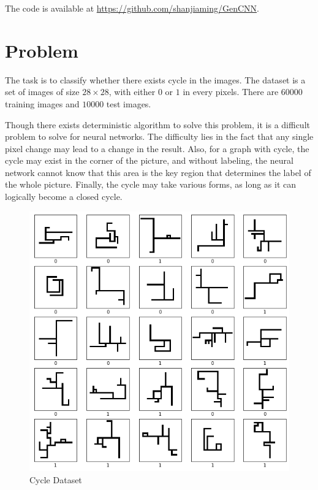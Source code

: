 \documentclass{article}
\begin{document}
The code is available at \url{https://github.com/shanjiaming/GenCNN}.

\section{Problem}

The task is to classify whether there exists cycle in the images. 
The dataset is a set of images of size $28\times 28$, with either $0$ or $1$ in every pixels. 
There are $60000$ training images and $10000$ test images.

Though there exists deterministic algorithm to solve this problem, it is a difficult problem to solve for neural networks.
The difficulty lies in the fact that any single pixel change may lead to a change in the result. 
Also, for a graph with cycle, the cycle may exist in the corner of the picture, 
and without labeling, the neural network cannot know that this area is the key region that determines the label of the whole picture.
Finally, the cycle may take various forms, as long as it can logically become a closed cycle.

\begin{figure}[H] %
    \centering %
    \includegraphics[width=1.0\textwidth]{../image/img25.png} %
    \caption{Cycle Dataset} %
    \label{Fig.img25} %
\end{figure}
\end{document}
